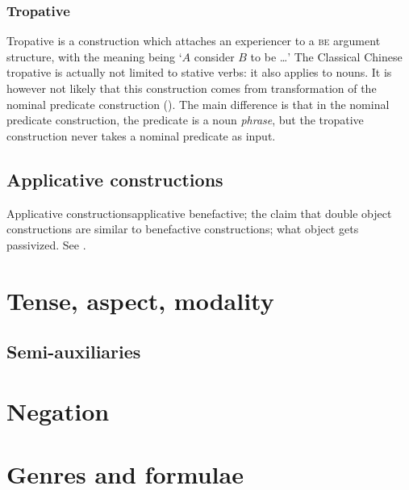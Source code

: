 \documentclass[UTF8, a4paper, oneside, scheme=plain, 12pt]{ctexrep}
\newcommand*{\citepage}[1]{p.~{#1}}
\newcommand*{\citepages}[1]{pp.~{#1}}
\newcommand{\translate}[1]{`#1'}
\newcommand*{\category}[1]{\textsc{#1}}
\begin{document}
\subsection{Tropative}

Tropative is a construction which attaches an experiencer to a \category{be} argument structure,
with the meaning being \translate{$A$ consider $B$ to be \dots}
\citep[\citepages{413-414}]{meiguang2018}
The Classical Chinese tropative is actually not limited to stative verbs:
it also applies to nouns.
It is however not likely that this construction comes from transformation of the nominal predicate construction
().
The main difference is that in the nominal predicate construction,
the predicate is a noun \emph{phrase},
but the tropative construction never takes a nominal predicate as input.

\section{Applicative constructions}

\begin{todobox}{Applicative constructions}{applicative}
    benefactive; the claim that double object constructions are similar to benefactive constructions;
    what object gets passivized.
    See \citet[\citepage{421}]{meiguang2018}.
\end{todobox}

\chapter{Tense, aspect, modality}

\section{Semi-auxiliaries}\label{sec:tam.semi-auxiliaries}



\chapter{Negation}

\chapter{Genres and formulae}

\section{}
\end{document}
